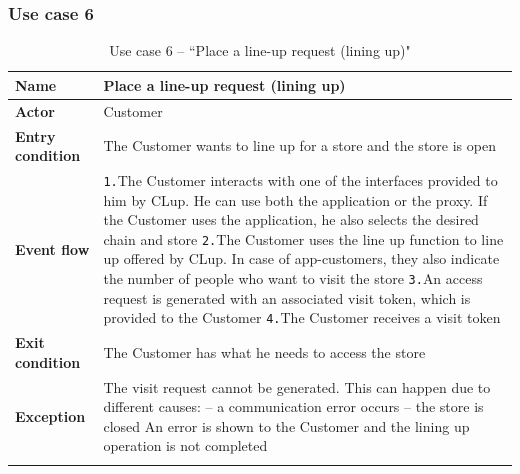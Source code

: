 \documentclass[a4paper,oneside,11pt]{book}   %
\begin{document}
    \subsubsection{Use case 6}
    \begin{longtable}[c] { |>{\bfseries{}}C{0.25\textwidth}|V{0.55\textwidth}| }
        \hline
        Name            & Place a line-up request (lining up) \\ \hline
        Actor           & Customer \\ \hline
        Entry condition & The Customer wants to line up for a store and the store is open \\ \hline
        Event flow      & 
        \texttt{1.}The Customer interacts with one of the interfaces provided to him by CLup. He can use both the application or the proxy. If the Customer uses the application, he also selects the desired chain and store \newline
        \texttt{2.}The Customer uses the line up function to line up offered by CLup. In case of app-customers, they also indicate the number of people who want to visit the store \newline
        \texttt{3.}An access request is generated with an associated visit token, which is provided to the Customer \newline 
        \texttt{4.}The Customer receives a visit token \\ \hline
        Exit condition  & The Customer has what he needs to access the store \\ \hline
        Exception       & The visit request cannot be generated. This can happen due to different causes: \newline
        -- a communication error occurs \newline
        -- the store is closed \newline
        An error is shown to the Customer and the lining up operation is not completed \\
        \hline
    \caption{Use case 6 -- ``Place a line-up request (lining up)"}
    \label{table:use_case_06}
    \end{longtable}
    
\end{document}
